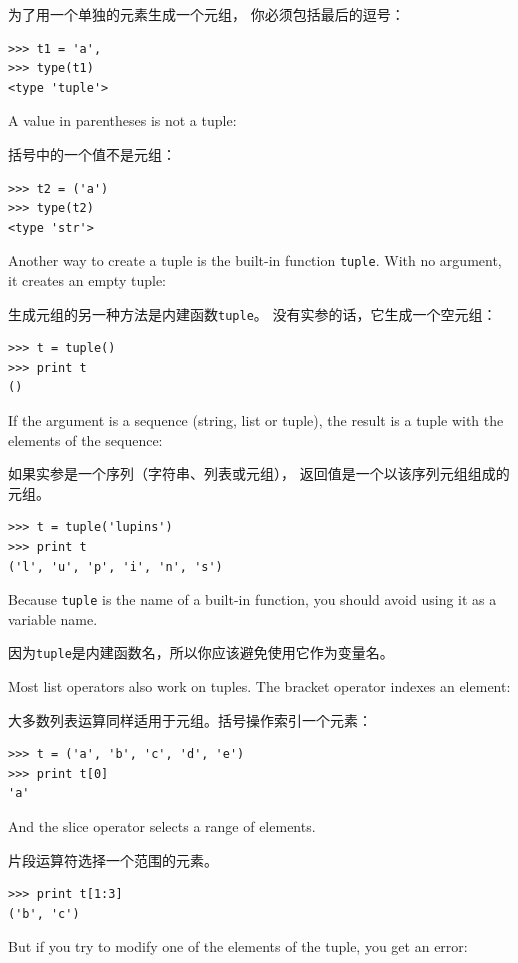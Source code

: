 \documentclass[10pt]{book}
\begin{document}
\begin{CJK}{UTF8}{gbsn}
为了用一个单独的元素生成一个元组，
你必须包括最后的逗号：

\begin{verbatim}
>>> t1 = 'a',
>>> type(t1)
<type 'tuple'>
\end{verbatim}
%
A value in parentheses is not a tuple:

括号中的一个值不是元组：

\begin{verbatim}
>>> t2 = ('a')
>>> type(t2)
<type 'str'>
\end{verbatim}
%
Another way to create a tuple is the built-in function {\tt tuple}.
With no argument, it creates an empty tuple:

生成元组的另一种方法是内建函数{\tt tuple}。
没有实参的话，它生成一个空元组：

\begin{verbatim}
>>> t = tuple()
>>> print t
()
\end{verbatim}
%
If the argument is a sequence (string, list or tuple), the result
is a tuple with the elements of the sequence:

如果实参是一个序列（字符串、列表或元组），
返回值是一个以该序列元组组成的元组。

\begin{verbatim}
>>> t = tuple('lupins')
>>> print t
('l', 'u', 'p', 'i', 'n', 's')
\end{verbatim}
%
Because {\tt tuple} is the name of a built-in function, you should
avoid using it as a variable name.

因为{\tt tuple}是内建函数名，所以你应该避免使用它作为变量名。

Most list operators also work on tuples.  The bracket operator
indexes an element:

大多数列表运算同样适用于元组。括号操作索引一个元素：

\begin{verbatim}
>>> t = ('a', 'b', 'c', 'd', 'e')
>>> print t[0]
'a'
\end{verbatim}
%
And the slice operator selects a range of elements.

片段运算符选择一个范围的元素。

\begin{verbatim}
>>> print t[1:3]
('b', 'c')
\end{verbatim}
%
But if you try to modify one of the elements of the tuple, you get
an error:


\end{CJK}
\end{document}
